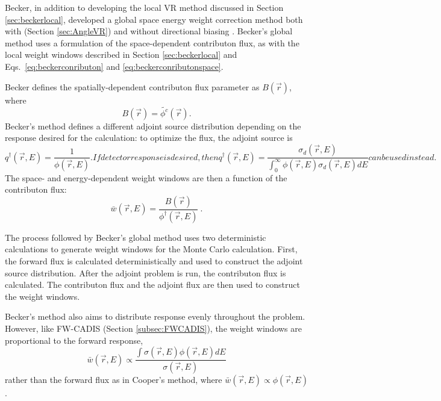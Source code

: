 Becker, in addition to developing the local VR method discussed in Section
\ref{sec:beckerlocal}, developed a global space 
energy weight correction method both with (Section \ref{sec:AngleVR}) and
without directional biasing \cite{becker_hybrid_2007, becker_hybrid_2009}.
\label{eq.beckerglobal}
Becker's global method uses a formulation of the space-dependent
contributon flux, as with the local weight windows described in Section
\ref{sec:beckerlocal} and Eqs.\ \eqref{eq:beckerconributon} and
\eqref{eq:beckerconributonspace}. 

Becker defines the spatially-dependent
contributon flux parameter as
$B(\vec{r})$, where
\begin{equation}
  B(\vec{r}) = \tilde{\phi^c}(\vec{r}).
\end{equation}
Becker's method defines a different adjoint source
distribution depending on the response desired for the calculation:
to optimize the flux, the adjoint source is
\begin{subequations}
\begin{equation}
  q^{\dagger}(\vec{r},E) = \frac{1}{\phi(\vec{r},E)}.
\end{equation}
If detector response is desired, then
\begin{equation}
  q^{\dagger}(\vec{r},E) = \frac{\sigma_d(\vec{r},E)}
  {\int_0^{\infty} \phi(\vec{r},E) \sigma_d(\vec{r},E) dE}
\end{equation}
can be used instead.
\end{subequations}
The space- and energy-dependent weight windows are then a function of the
contributon flux:
\begin{equation}
  \bar{w}(\vec{r},E) = \frac{B(\vec{r})}{\phi^{\dagger}(\vec{r},E)}\:.
\label{eq:beckerglobalww}
\end{equation}

The process followed by Becker's global method uses two deterministic
calculations to generate weight windows for the Monte Carlo calculation. First,
the forward flux is calculated deterministically and used to construct the adjoint source distribution. After the adjoint problem
is run, the contributon flux is calculated. The contributon flux and the adjoint
flux are then used to construct the weight windows.

Becker's method also aims to distribute response evenly throughout the problem. However, like FW-CADIS
(Section \ref{subsec:FWCADIS}),
the weight windows are proportional to the forward response,
\begin{equation}
  \bar{w}(\vec{r},E) \propto \frac{\int \sigma(\vec{r},E) \phi (\vec{r},E) dE}
                                  {\sigma (\vec{r},E)}
\end{equation}
rather than the forward flux as in Cooper's method, where
$\bar{w}(\vec{r},E) \propto \phi(\vec{r},E)$ .

